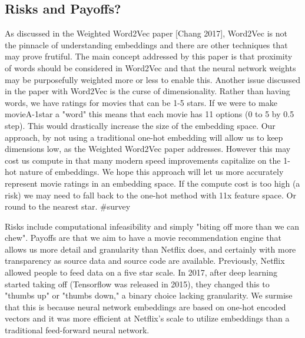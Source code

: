 \subsection{Risks and Payoffs?}

As discussed in the Weighted Word2Vec paper [Chang 2017], Word2Vec is not the pinnacle of understanding embeddings and there are other techniques that may prove frutiful. The main concept addressed by this paper is that proximity of words should be considered in Word2Vec and that the neural network weights may be purposefully weighted more or less to enable this. Another issue discussed in the paper with Word2Vec is the curse of dimensionality. Rather than having words, we have ratings for movies that can be 1-5 stars. If we were to make movieA-1star a "word" this means that each movie has 11 options (0 to 5 by 0.5 step). This would drastically increase the size of the embedding space. Our approach, by not using a traditional one-hot embedding will allow us to keep dimensions low, as the Weighted Word2Vec paper addresses. However this may cost us compute in that many modern speed improvements capitalize on the 1-hot nature of embeddings. We hope this approach will let us more accurately represent movie ratings in an embedding space. If the compute cost is too high (a risk) we may need to fall back to the one-hot method with 11x feature space. Or round to the nearest star. #survey

Risks include computational infeasibility and simply "biting off more than we can chew". Payoffs are that we aim to have a movie recommendation engine that allows us more detail and granularity than Netflix does, and certainly with more transparency as source data and source code are available. Previously, Netflix allowed people to feed data on a five star scale. In 2017, after deep learning started taking off (Tensorflow was released in 2015), they changed this to "thumbs up" or "thumbs down," a binary choice lacking granularity. We surmise that this is because neural network embeddings are based on one-hot encoded vectors and it was more efficient at Netflix's scale to utilize embeddings than a traditional feed-forward neural network.